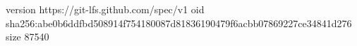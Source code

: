 version https://git-lfs.github.com/spec/v1
oid sha256:abe0b6ddfbd508914f754180087d81836190479f6acbb07869227ce34841d276
size 87540
